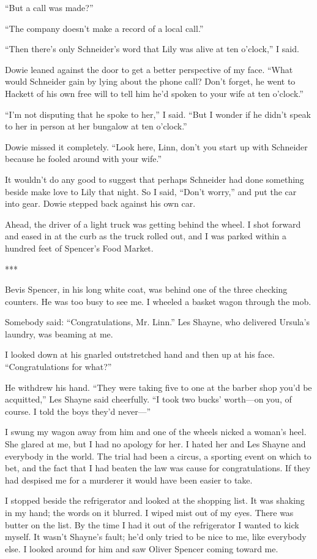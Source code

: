 \documentclass{novel}
\begin{document}
{“But a call was made?”

“The company doesn’t make a record of a local call.”

“Then there’s only Schneider’s word that Lily was alive at ten o’clock,” I said.

Dowie leaned against the door to get a better perspective of my face. “What would Schneider gain by lying about the phone call? Don’t forget, he went to Hackett of his own free will to tell him he’d spoken to your wife at ten o’clock.”

“I’m not disputing that he spoke to her,” I said. “But I wonder if he didn’t speak to her in person at her bungalow at ten o’clock.”

Dowie missed it completely. “Look here, Linn, don’t you start up with Schneider because he fooled around with your wife.”

It wouldn’t do any good to suggest that perhaps Schneider had done something beside make love to Lily that night. So I said, “Don’t worry,” and put the car into gear. Dowie stepped back against his own car.

Ahead, the driver of a light truck was getting behind the wheel. I shot forward and eased in at the curb as the truck rolled out, and I was parked within a hundred feet of Spencer’s Food Market.

***

Bevis Spencer, in his long white coat, was behind one of the three checking counters. He was too busy to see me. I wheeled a basket wagon through the mob.

Somebody said: “Congratulations, Mr. Linn.” Les Shayne, who delivered Ursula’s laundry, was beaming at me.

I looked down at his gnarled outstretched hand and then up at his face. “Congratulations for what?”

He withdrew his hand. “They were taking five to one at the barber shop you’d be acquitted,” Les Shayne said cheerfully. “I took two bucks’ worth—on you, of course. I told the boys they’d never—”

I swung my wagon away from him and one of the wheels nicked a woman’s heel. She glared at me, but I had no apology for her. I hated her and Les Shayne and everybody in the world. The trial had been a circus, a sporting event on which to bet, and the fact that I had beaten the law was cause for congratulations. If they had despised me for a murderer it would have been easier to take.

I stopped beside the refrigerator and looked at the shopping list. It was shaking in my hand; the words on it blurred. I wiped mist out of my eyes. There was butter on the list. By the time I had it out of the refrigerator I wanted to kick myself. It wasn’t Shayne’s fault; he’d only tried to be nice to me, like everybody else. I looked around for him and saw Oliver Spencer coming toward me.

}
\end{document}
